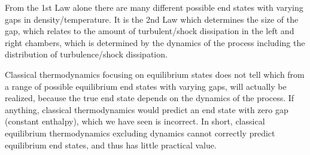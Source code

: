From the 1st Law alone there are many different possible end states with varying
gaps in density/temperature.
It is the 2nd Law which determines the size of the gap, which relates to the
amount of turbulent/shock dissipation
in the left and right chambers, which is determined by the dynamics of the
process including
the distribution of turbulence/shock dissipation.

Classical thermodynamics focusing on equilibrium states does not tell which from
a range of
possible equilibrium end states with varying gaps, will actually be realized,
because the true end state depends on the dynamics
of the process. If anything, classical thermodynamics would predict an end state
with zero gap (constant enthalpy), which we have seen is incorrect.
In short, classical equilibrium thermodynamics excluding dynamics cannot
correctly
predict equilibrium end states, and thus has little practical value.

